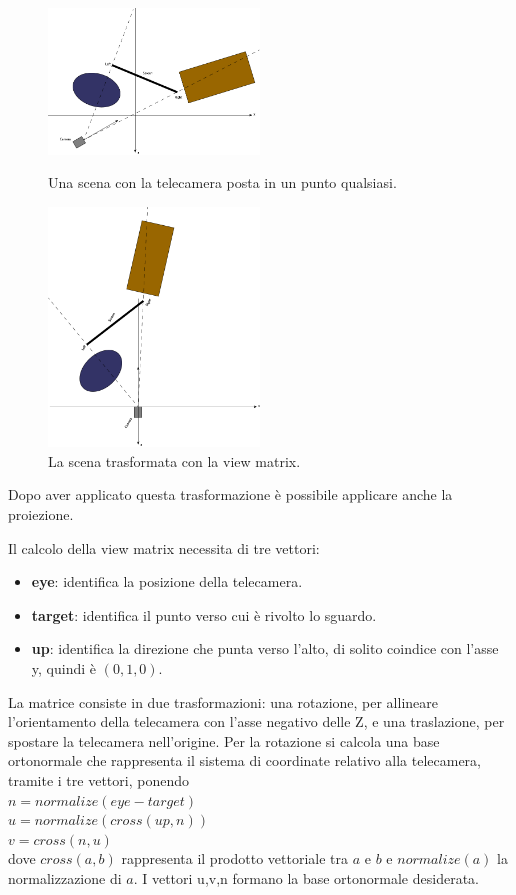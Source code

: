 \begin{figure}[htbp]
\centering
\includegraphics[width=0.5\textwidth]{images/frustum/view-matrix1.png}
\caption{Una scena con la telecamera posta in un punto qualsiasi.\label{view1}}
\includegraphics[width=0.5\textwidth]{images/frustum/view-matrix2.png}
\caption{La scena trasformata con la view matrix.\label{view2}}
\end{figure}


Dopo aver applicato questa trasformazione è possibile applicare anche la proiezione.

Il calcolo della view matrix necessita di tre vettori:
\begin{itemize}
\item \textbf{eye}: identifica la posizione della telecamera.
\item \textbf{target}: identifica il punto verso cui è rivolto lo sguardo.
\item \textbf{up}: identifica la direzione che punta verso l'alto, di solito coindice con l'asse y, quindi è $(0, 1, 0)$.
\end{itemize}

La matrice consiste in due trasformazioni: una rotazione, per allineare l'orientamento della telecamera con l'asse negativo delle Z, e una traslazione, per spostare la telecamera nell'origine.
Per la rotazione si calcola una base ortonormale che rappresenta il sistema di coordinate relativo alla telecamera, tramite i tre vettori, ponendo\\
$n = normalize(eye - target)$\\
$u = normalize(cross(up,n))$\\
$v = cross(n,u)$\\
dove $cross(a,b)$ rappresenta il prodotto vettoriale tra $a$ e $b$ e $normalize(a)$ la normalizzazione di $a$. I vettori u,v,n formano la base ortonormale desiderata.

